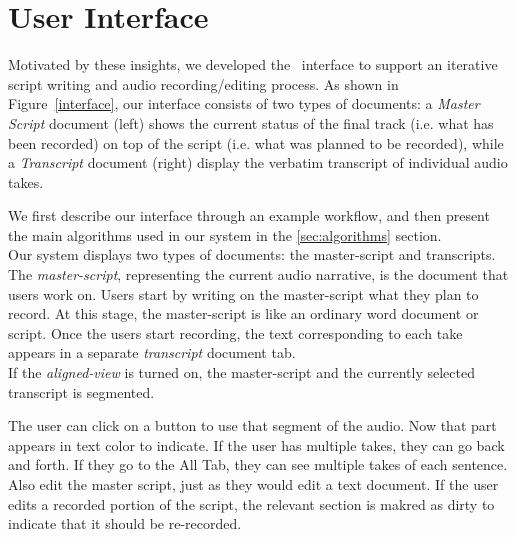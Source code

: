 \section{User Interface}
Motivated by these insights, we developed the \systemname\  interface to support an iterative script writing and  audio recording/editing process. As shown in Figure~\ref{interface}, our interface
consists of two types of documents: a \textit{Master Script} document (left) shows the current status of the final track (i.e. what has been recorded) on top of the script (i.e. what was planned to be recorded), while a \textit{Transcript} document (right) display the verbatim transcript of individual audio takes. 



We first describe our interface through an example workflow, and then present the main algorithms used in our system in the \ref{sec:algorithms} section.\\
 Our system displays two types of documents: the master-script and transcripts. The \textit{master-script}, representing the current audio narrative, is the document that users work on. Users start by writing on the master-script what they plan to
record. At this stage, the master-script is like an ordinary
word document or script. Once the users start recording, the text corresponding to each take appears in a separate \textit{transcript} document tab.\\
If the \textit{aligned-view} is turned on, the master-script and the currently selected transcript is segmented.

The user can click on a button to use that segment of the audio. Now that part appears in text color to indicate. If the user has multiple takes, they can go back and forth. If they go to the All Tab, they can see multiple takes of each sentence.
Also edit the master script, just as they would edit a text document. If the user edits a recorded portion of the script, the relevant section is makred as dirty to indicate that it should be re-recorded.


